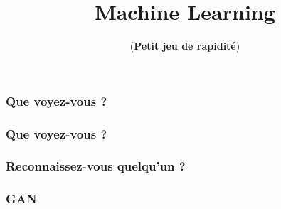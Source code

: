\documentclass{formation}
\title{Machine Learning}
\subtitle{(\textbf{Petit jeu de rapidité})}
\begin{document}
\maketitle

\begin{frame}
  \frametitle{Que voyez-vous ?}
\end{frame}

\begin{frame}
  \frametitle{Que voyez-vous ?}
\end{frame}

\begin{frame}
  \frametitle{Reconnaissez-vous quelqu'un ?}
\end{frame}

\begin{frame}
  \frametitle{GAN}
\end{frame}
\end{document}

